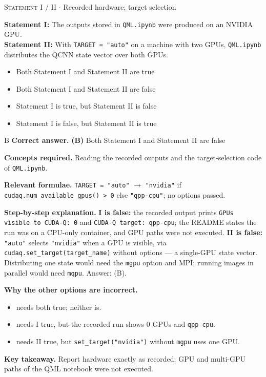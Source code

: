 \documentclass[11pt,a4paper]{article}
\newcommand{\optlabel}[1]{\textbf{(#1)}}
\newcommand{\correctlabel}[1]{\textcolor{okgreen}{\textbf{(#1)}\,\ding{51}}}
\newenvironment{qitem}[1]{\begin{list}{}{\setlength{\leftmargin}{3.3em}\setlength{\labelwidth}{3.1em}%
  \setlength{\labelsep}{0.2em}\setlength{\topsep}{3pt}\setlength{\parsep}{3pt}}\item[\textbf{Q.#1}\hfill]}{\end{list}}
\newcommand{\qsep}{\par\vspace{2pt}{\color{black!15}\hrule}\vspace{4pt}}
\newcommand{\qmeta}[2]{{\footnotesize\color{black!60}\textsc{#1} \;$\cdot$\; #2}\par}
\begin{document}
\begin{qitem}{78}
\qmeta{Statement I / II}{Recorded hardware; target selection}
\textbf{Statement I:} The outputs stored in \texttt{QML.ipynb} were produced on an NVIDIA GPU.\\[1mm]
\textbf{Statement II:} With \texttt{TARGET = "auto"} on a machine with two GPUs, \texttt{QML.ipynb} distributes the QCNN state vector over both GPUs.
\begin{itemize}[leftmargin=2.6em, labelsep=0.4em, itemsep=2pt, topsep=3pt]
\item[\optlabel{A}] Both Statement I and Statement II are true
\item[\correctlabel{B}] Both Statement I and Statement II are false
\item[\optlabel{C}] Statement I is true, but Statement II is false
\item[\optlabel{D}] Statement I is false, but Statement II is true
\end{itemize}
\end{qitem}
\begin{solbox}{B}
\textbf{\color{brand}Correct answer.} \textcolor{okgreen}{\textbf{(B)}} Both Statement I and Statement II are false

\textbf{\color{brand}Concepts required.} Reading the recorded outputs and the target-selection code of \texttt{QML.ipynb}.

\textbf{\color{brand}Relevant formulae.} \texttt{TARGET = "auto"} $\to$ \texttt{"nvidia"} if \texttt{cudaq.num\_available\_gpus() > 0} else \texttt{"qpp-cpu"}; no options passed.

\textbf{\color{brand}Step-by-step explanation.} \textbf{I is false:} the recorded output prints \texttt{GPUs visible to CUDA-Q: 0} and \texttt{CUDA-Q target: qpp-cpu}; the README states the
run was on a CPU-only container, and GPU paths were not executed. \textbf{II is false:} \texttt{"auto"} selects \texttt{"nvidia"} when a GPU is
visible, via \texttt{cudaq.set\_target(target\_name)} without options --- a single-GPU state vector. Distributing one state would need the
\texttt{mgpu} option and MPI; running images in parallel would need \texttt{mqpu}. Answer: (B).

\textbf{\color{brand}Why the other options are incorrect.}
\begin{itemize}[leftmargin=2.4em, itemsep=1pt, topsep=2pt]
\item[\textbf{(A)}] needs both true; neither is.
\item[\textbf{(C)}] needs I true, but the recorded run shows 0 GPUs and \texttt{qpp-cpu}.
\item[\textbf{(D)}] needs II true, but \texttt{set\_target("nvidia")} without \texttt{mgpu} uses one GPU.
\end{itemize}
\textbf{\color{brand}Key takeaway.} Report hardware exactly as recorded; GPU and multi-GPU paths of the QML notebook were not executed.
\end{solbox}
\qsep
\end{document}
